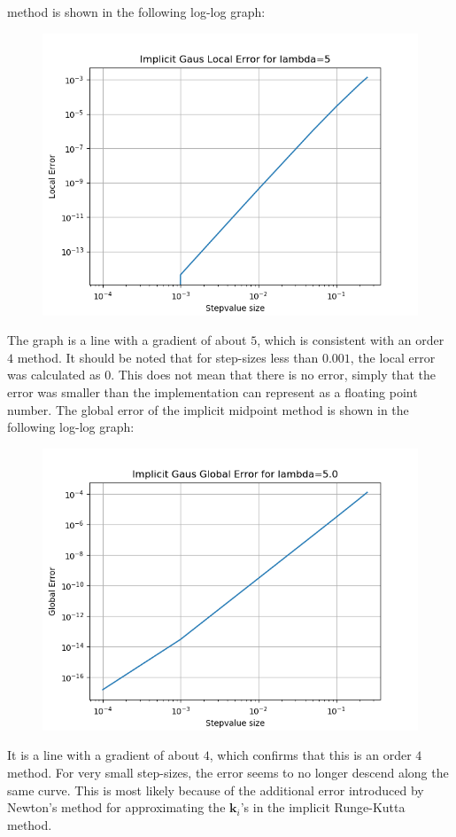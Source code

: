 \documentclass{article}
\theoremstyle{definition}
\begin{document}
\begin{itemize}
		method is shown in the following log-log graph:
		\begin{figure}[H]
			\includegraphics[scale=0.6]{implicit_gauss_local_loglog}
		\end{figure}
		The graph is a line with a gradient of about $5$, which is
		consistent with an order $4$ method.  It should be noted that
		for step-sizes less than $0.001$, the local error was calculated
		as $0$.  This does not mean that there is no error, simply that
		the error was smaller than the implementation can represent as a
		floating point number.
		The global error of the implicit midpoint
		method is shown in the following log-log graph:
		\begin{figure}[H]
			\includegraphics[scale=0.6]{implicit_gauss_global_loglog}
		\end{figure}
		It is a line with a gradient of about $4$, which confirms that
		this is an order $4$ method. For very small step-sizes, the error
		seems to no longer descend along the same curve.  This is most
		likely because of the additional error introduced by Newton's
		method for approximating the $\mathbf{k}_i$'s in the implicit Runge-Kutta
		method.



\end{itemize}
\end{document}
